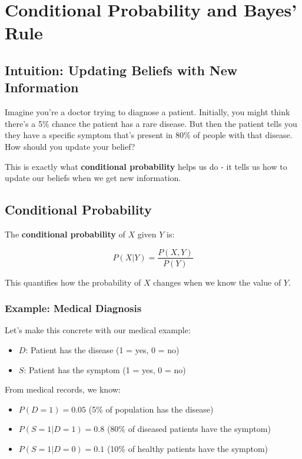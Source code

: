 
\section{Conditional Probability and Bayes' Rule }
\label{sec:conditional-probability}

\subsection{Intuition: Updating Beliefs with New Information}

Imagine you're a doctor trying to diagnose a patient. Initially, you might think there's a 5\% chance the patient has a rare disease. But then the patient tells you they have a specific symptom that's present in 80\% of people with that disease. How should you update your belief?

This is exactly what \textbf{conditional probability} helps us do - it tells us how to update our beliefs when we get new information.

\subsection{Conditional Probability}

The \textbf{conditional probability} of $X$ given $Y$ is:

\begin{equation}
P(X|Y) = \frac{P(X, Y)}{P(Y)}
\end{equation}

This quantifies how the probability of $X$ changes when we know the value of $Y$.

\subsubsection{Example: Medical Diagnosis}

Let's make this concrete with our medical example:
\begin{itemize}
    \item $D$: Patient has the disease (1 = yes, 0 = no)
    \item $S$: Patient has the symptom (1 = yes, 0 = no)
\end{itemize}

From medical records, we know:
\begin{itemize}
    \item $P(D=1) = 0.05$ (5\% of population has the disease)
    \item $P(S=1|D=1) = 0.8$ (80\% of diseased patients have the symptom)
    \item $P(S=1|D=0) = 0.1$ (10\% of healthy patients have the symptom)
\end{itemize}

